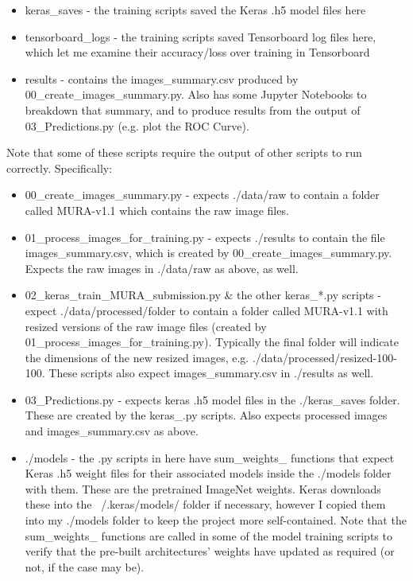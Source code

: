\documentclass[11pt]{article} %
\theoremstyle{plain}
\theoremstyle{definition}
\begin{document}
\begin{itemize}
\item keras\_saves - the training scripts saved the Keras .h5 model files here
\item tensorboard\_logs - the training scripts saved Tensorboard log files here, which let me examine their accuracy/loss over training in Tensorboard
\item results - contains the images\_summary.csv produced by 00\_create\_images\_summary.py. Also has some Jupyter Notebooks to breakdown that summary, and to produce results from the output of 03\_Predictions.py (e.g. plot the ROC Curve).
\end{itemize}
\noindent
Note that some of these scripts require the output of other scripts to run correctly. Specifically:
\begin{itemize}
\item 00\_create\_images\_summary.py - expects ./data/raw to contain a folder called MURA-v1.1 which contains the raw image files.
\item 01\_process\_images\_for\_training.py - expects ./results to contain the file images\_summary.csv, which is created by 00\_create\_images\_summary.py. Expects the raw images in ./data/raw as above, as well.
\item 02\_keras\_train\_MURA\_submission.py \& the other keras\_*.py scripts - expect ./data/processed/{folder} to contain a folder called MURA-v1.1 with resized versions of the raw image files (created by 01\_process\_images\_for\_training.py). Typically the final {folder} will indicate the dimensions of the new resized images, e.g. ./data/processed/resized-100-100. These scripts also expect images\_summary.csv in ./results as well.
\item 03\_Predictions.py - expects keras .h5 model files in the ./keras\_saves folder. These are created by the keras\_\*.py scripts. Also expects processed images and images\_summary.csv as above.
\item ./models - the .py scripts in here have sum\_weights\_\* functions that expect Keras .h5 weight files for their associated models inside the ./models folder with them. These are the pretrained ImageNet weights. Keras downloads these into the ~/.keras/models/ folder if necessary, however I copied them into my ./models folder to keep the project more self-contained. Note that the sum\_weights\_\* functions are called in some of the model training scripts to verify that the pre-built architectures' weights have updated as required (or not, if the case may be).
\end{itemize}
\end{document}
